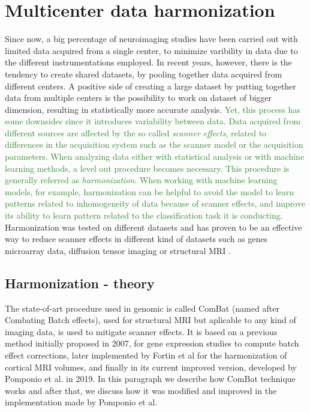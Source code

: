 \documentclass[11pt]{report}
\begin{document}
\newpage


\chapter{Multicenter data harmonization}\label{chap:harmonization_theory}
Since now, a big percentage of neuroimaging studies have been carried out with limited data acquired from a single center, to minimize varibility in data due to the different instrumentations employed.
In recent years, however, there is the tendency to create shared datasets, by pooling together data acquired from different centers.
A positive side of creating a large dataset by putting together data from multiple centers is the possibility to work on dataset of bigger dimension, resulting in statistically more accurate analysis.
\textcolor{ForestGreen}{
Yet, this process has some downsides since it introduces variability between data.
Data acquired from different sources are affected by the so called \emph{scanner effects}, related to differences in the acquisition system such as the scanner model or the acquisition parameters.
When analyzing data either with statistical analysis or with machine learning methods, a level out procedure becomes necessary.
This procedure is generally referred as \emph{harmonization}.
When working with machine learning models, for example, harmonization can be helpful to avoid the model to learn patterns related to inhomogeneity of data because of scanner effects, and improve its ability to learn pattern related to the classification task it is conducting.
}
Harmonization was tested on different datasets and has proven to be an effective way to reduce scanner effects in different kind of datasets such as genes microarray data, diffusion tensor imaging or structural MRI \cite{johnson-2006} \cite{fortin-2017} \cite{lombardi2020}.

\section{Harmonization - theory}\label{sec:harmonizationtheory}


The state-of-art procedure used in genomic is called ComBat (named after Combating Batch effects), used for structural MRI but aplicable to any kind of imaging data, is used to mitigate scanner effects.
It is based on a previous method initially proposed in 2007, for gene expression studies to compute batch effect corrections, later implemented by Fortin et al \cite{fortin-2018} for the harmonization of cortical MRI volumes, and finally in its current improved version, developed by Pomponio et al. \cite{pomponio-2019} in 2019.
In this paragraph we describe how ComBat technique works and after that, we discuss how it was modified and improved in the implementation made by Pomponio et al.
\end{document}
